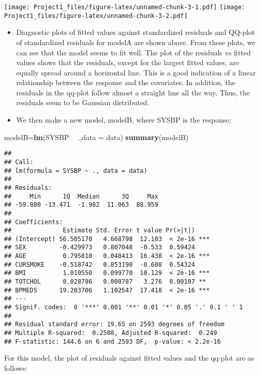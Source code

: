 \documentclass[]{article}
\newenvironment{Shaded}{\begin{snugshade}}{\end{snugshade}}
\newcommand{\KeywordTok}[1]{\textcolor[rgb]{0.13,0.29,0.53}{\textbf{#1}}}
\newcommand{\DataTypeTok}[1]{\textcolor[rgb]{0.13,0.29,0.53}{#1}}
\newcommand{\StringTok}[1]{\textcolor[rgb]{0.31,0.60,0.02}{#1}}
\newcommand{\OperatorTok}[1]{\textcolor[rgb]{0.81,0.36,0.00}{\textbf{#1}}}
\newcommand{\NormalTok}[1]{#1}
\begin{document}
\texttt{[image: Project1\_files/figure-latex/unnamed-chunk-3-1.pdf]}
\texttt{[image: Project1\_files/figure-latex/unnamed-chunk-3-2.pdf]}

\begin{itemize}
\item
  Diagnostic plots of fitted values against standardized residuals and
  QQ-plot of standardized residuals for modelA are shown above. From
  these plots, we can see that the model seems to fit well. The plot of
  the residuals vs fitted values shows that the residuals, except for
  the largest fitted values, are equally spread around a horizontal
  line. This is a good indication of a linear relationship between the
  response and the covariates. In addition, the residuals in the qq-plot
  follow almost a straight line all the way. Thus, the residuals seem to
  be Gaussian distributed.
\item
  We then make a new model, modelB, where SYSBP is the response:
\end{itemize}

\begin{Shaded}
\begin{Highlighting}[]
\NormalTok{modelB=}\KeywordTok{lm}\NormalTok{(SYSBP }\OperatorTok{~}\StringTok{ }\NormalTok{.,}\DataTypeTok{data =}\NormalTok{ data)}
\KeywordTok{summary}\NormalTok{(modelB)}
\end{Highlighting}
\end{Shaded}

\begin{verbatim}
## 
## Call:
## lm(formula = SYSBP ~ ., data = data)
## 
## Residuals:
##     Min      1Q  Median      3Q     Max 
## -59.800 -13.471  -1.982  11.063  88.959 
## 
## Coefficients:
##              Estimate Std. Error t value Pr(>|t|)    
## (Intercept) 56.505170   4.668798  12.103  < 2e-16 ***
## SEX         -0.429973   0.807048  -0.533  0.59424    
## AGE          0.795810   0.048413  16.438  < 2e-16 ***
## CURSMOKE    -0.518742   0.853190  -0.608  0.54324    
## BMI          1.010550   0.099770  10.129  < 2e-16 ***
## TOTCHOL      0.028786   0.008787   3.276  0.00107 ** 
## BPMEDS      19.203706   1.102547  17.418  < 2e-16 ***
## ---
## Signif. codes:  0 '***' 0.001 '**' 0.01 '*' 0.05 '.' 0.1 ' ' 1
## 
## Residual standard error: 19.65 on 2593 degrees of freedom
## Multiple R-squared:  0.2508, Adjusted R-squared:  0.249 
## F-statistic: 144.6 on 6 and 2593 DF,  p-value: < 2.2e-16
\end{verbatim}

For this model, the plot of residuals against fitted values and the
qq-plot are as follows:
\end{document}

